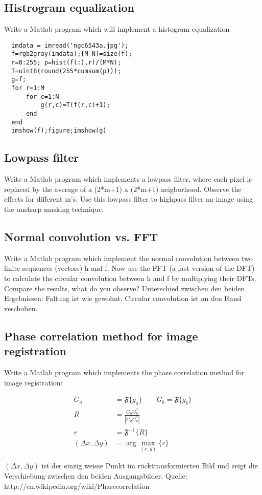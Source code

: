 \subsection{Histrogram equalization}
Write a Matlab program which will implement a histogram equalization
\begin{lstlisting}
  imdata = imread('ngc6543a.jpg');
  f=rgb2gray(imdata);[M N]=size(f);
  r=0:255; p=hist(f(:),r)/(M*N);
  T=uint8(round(255*cumsum(p)));
  g=f;
  for r=1:M
      for c=1:N
          g(r,c)=T(f(r,c)+1);
      end
  end
  imshow(f);figure;imshow(g)
\end{lstlisting}
\subsection{Lowpass filter}
Write a Matlab program which implements a lowpass filter, where each pixel is
replaced by the average of a (2*m+1) x (2*m+1) neigborhood. Observe the effects for different m's. Use this lowpass filter to highpass filter an image using the unsharp masking technique. 
\subsection{Normal convolution vs. FFT}
Write a Matlab program which implement the normal convolution between two finite
sequences (vectors) h and f. Now use the FFT (a fast version of the DFT) to calculate the circular convolution between h and f by multiplying their DFTs. Compare the results, what do you observe?
Unterschied zwischen den beiden Ergebnissen: Faltung ist wie gewohnt, Circular convolution ist an den Rand veschoben.


\subsection{Phase correlation method for image registration}
Write a Matlab program which implements the phase correlation method for image
registration:

\begin{align}
	G_a &= \mathfrak{F}\{g_a\} \qquad G_b = \mathfrak{F}\{g_b\} \\
	R   &= \frac{G_aG_b^\ast}{|G_aG_b^\ast|} \\
	r   &= \mathfrak{F}^{-1}\{R\} \\
	(\Delta x, \Delta y) &= \arg \max_{(x, y)}\{r\}
\end{align}

$(\Delta x, \Delta y)$ ist der einzig weisse Punkt im rücktransformierten Bild und zeigt die Verschiebung zwischen den beiden Ausgangsbilder.
Quelle: http://en.wikipedia.org/wiki/Phase\textunderscore correlation

